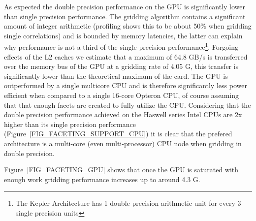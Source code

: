 As expected the double precision performance on the GPU is significantly lower than single precision performance. The gridding algorithm contains a significant amount of
integer arithmetic (profiling shows this to be about 50\% when gridding single correlations) and 
is bounded by memory latencies, the latter can explain why performance is not a third of the single precision
performance\footnote{The Kepler Architecture has 1 double precision arithmetic unit for every 3 single precision units}. 
Forgoing effects of the L2 caches we estimate that a maximum of 64.8 GB/s is transferred over the memory bus of the GPU at a gridding rate of 
4.05 G, this transfer is significantly lower than the theoretical maximum of the card. The GPU is outperformed by a single multicore CPU and is
therefore significantly less power efficient when compared to a single 16-core Opteron CPU, of course assuming that
that enough facets are created to fully utilize the CPU. Considering that the double precision performance achieved on the Haswell series Intel CPUs
are 2x higher than its single precision performance (Figure~\ref{FIG_FACETING_SUPPORT_CPU}) it is clear that the prefered architecture is a multi-core (even multi-processor)
CPU node when gridding in double precision.

Figure~\ref{FIG_FACETING_GPU} shows that once the GPU is saturated with enough work gridding performance increases up to around 4.3 G. 
